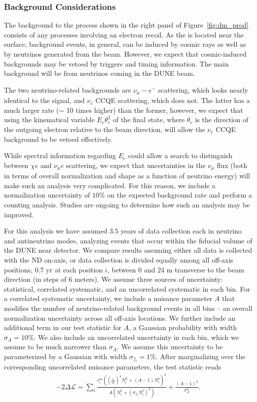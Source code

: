 \subsubsection{Background Considerations}
 The background to the process shown in the right panel of Figure~\ref{fig:dm_prod} consists of any processes involving an electron recoil. As the  is located near the surface, background events, in general, can be induced by cosmic rays as well as by neutrinos generated from the beam. However, we expect that cosmic-induced backgrounds may be vetoed by triggers and timing information. The main background will be from neutrinos coming in the DUNE beam.

The two neutrino-related backgrounds are $\nu_\mu -e^-$ scattering, which looks nearly identical to the signal, and $\nu_e$ CCQE scattering, which does not. The latter has a much larger rate ($\sim$ 10 times higher) than the former, however, we expect that using the kinematical variable $E_e \theta_e^2$ of the final state, where $\theta_e$ is the direction of the outgoing electron relative to the beam direction, will allow the $\nu_e$ CCQE background to be vetoed effectively.

While spectral information regarding $E_e$ could allow a search to distinguish between $\chi e$ and $\nu_\mu e$ scattering, we expect that uncertainties in the $\nu_\mu$ flux (both in terms of overall normalization and shape as a function of neutrino energy) will make such an analysis very complicated. For this reason, we include a normalization uncertainty of $10\%$ on the expected background rate and perform a counting analysis. Studies are ongoing to determine how such an analysis may be improved.

For this analysis we have assumed $3.5$ years of data collection each in neutrino and antineutrino modes, analyzing events that occur within the fiducial volume of the DUNE near detector. We compare results assuming either all data is collected with the ND on-axis, or data collection is divided equally among all off-axis positions, $0.7$ yr at each position  $i$, between $0$ and $24$ m transverse to the beam direction (in steps of 6 meters).
We assume three sources of uncertainty: statistical, correlated systematic, and an uncorrelated systematic in each bin. 
For a correlated systematic uncertainty, we include a nuisance parameter $A$ that modifies the number of neutrino-related background events in all bins -- an overall normalization uncertainty across all off-axis locations. 
We further include an additional term in our test statistic for $A$, a  Gaussian probability with width $\sigma_A = 10\%$. 
We also include an uncorrelated uncertainty in each bin, which we assume to be much narrower than $\sigma_A$. 
We assume this uncertainty to be parameterized by a Gaussian with width $\sigma_{f_i} = 1\%$. 
After marginalizing over the corresponding uncorrelated nuisance parameters, the test statistic reads
\begin{eqnarray}\label{eq:chisqfull}
-2\Delta \mathcal{L} = \sum_i \frac{r_i^m\left( \left(\frac{\varepsilon}{\varepsilon_0}\right)^4 N_i^\chi + (A-1)N_i^\nu\right)^2}{A\left(N_i^\nu + (\sigma_{f_i} N_i^\nu)^2 \right)} + \frac{\left(A-1\right)^2}{\sigma_A^2}.
\end{eqnarray}


